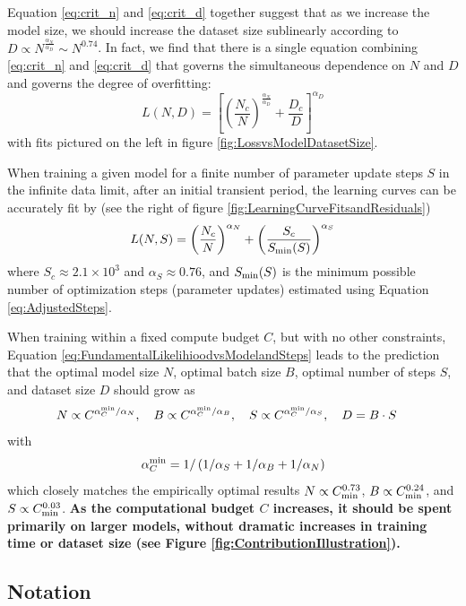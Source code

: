 \documentclass[english]{article}
\newcommand{\be}{\begin{equation}}
\newcommand{\ee}{\end{equation}}
\begin{document}
Equation \eqref{eq:crit_n} and \eqref{eq:crit_d} together suggest that as we increase the model size, we should increase the dataset size sublinearly according to $D \propto N^{\frac{\alpha_N}{\alpha_D}} \sim N^{0.74}$. In fact, we find that there is a single equation combining \eqref{eq:crit_n} and \eqref{eq:crit_d} that governs the simultaneous dependence on $N$ and $D$ and governs the degree of overfitting:
\be
\label{eq:FundamentalLikelihioodvsModelandDataSize}
L(N, D) 
= \left[ \left( \frac{N_c}{N} \right)^{\frac{\alpha_N}{\alpha_D}} + \frac{D_c}{D}  \right]^{\alpha_D}
\ee
with fits pictured on the left in figure \ref{fig:LossvsModelDatasetSize}.

When training a given model for a finite number of parameter update steps $S$ in the infinite data limit, after an initial transient period, the learning curves can be accurately fit by  (see the right of figure \ref{fig:LearningCurveFitsandResiduals})
\be
\label{eq:FundamentalLikelihioodvsModelandSteps}
L(N, S) = \left( \frac{N_c}{N} \right)^{\alpha_N}  + \left( \frac{S_c }{S_{\rm min}(S)} \right)^{\alpha_S}
\ee
where $S_c \approx 2.1 \times 10^3$ and $\alpha_S \approx 0.76$, and $S_{\rm min}(S)$ is the minimum possible number of optimization steps (parameter updates)
estimated  using Equation \eqref{eq:AdjustedSteps}.

When training within a fixed compute budget $C$, but with no other constraints, Equation \eqref{eq:FundamentalLikelihioodvsModelandSteps} leads to the prediction that the optimal model size $N$, optimal batch size $B$, optimal number of steps $S$, and dataset size $D$ should grow as 
\be
\label{eq:OptimalModelSizeTrainingTimevsCompute}
N \propto C^{\alpha_{C}^{\rm min} /\alpha_{N}}, \quad
B \propto C^{\alpha_C^{\rm min} / \alpha_B}, \quad
S \propto C^{\alpha_C^{\rm min} / \alpha_S}, \quad
D = B\cdot S \quad
\ee
with
\be
\alpha_{C}^{\rm min} = 1/\left(1/\alpha_{S}+1/\alpha_{B}+1/\alpha_{N}\right) 
\ee
which closely matches the empirically optimal results $N \propto C_{\rm min}^{0.73}$, $B \propto C_{\rm min}^{0.24}$, and $S \propto C_{\rm min}^{0.03}$.
\textbf{As the computational budget $C$ increases, it should be spent primarily on larger models, without dramatic increases in training time or dataset size (see Figure \ref{fig:ContributionIllustration}).}

\subsection{Notation}
\end{document}
